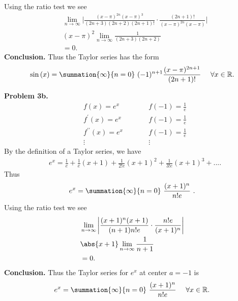 \documentclass{report}
\begin{document}
    Using the ratio test we see
    \begin{align*}
        &\lim\limits_{n \to \infty}{\bigg\lvert \frac{(x-\pi)^{2n}(x-\pi)^{3}}{(2n+3)(2n+2)(2n+1)!} \cdot \frac{(2n+1)!}{(x-\pi)^{2n}(x-\pi)} \bigg\rvert} \\
        &(x-\pi)^{2}\lim\limits_{n \to \infty}{\frac{1}{(2n+3)(2n+2)}} \\
        &=0
    .\end{align*}
    \textbf{Conclusion.} Thus the Taylor series has the form
    \begin{align*}
        \sin{(x)} = \summation{\infty}{n=0}\ (-1)^{n+1}\frac{(x-\pi)^{2n+1}}{(2n+1)!}\  \quad \forall x\in \mathbb{R}
    .\end{align*}

    \bigbreak \noindent 
    \textbf{Problem 3b.} 
    \begin{equation}
    \begin{alignedat}{2}
        &f(x) = e^{x} \quad \quad &&f(-1) = \frac{1}{e} \\
        &f^{\prime}(x) = e^{x} \quad \quad &&f(-1) = \frac{1}{e} \\
        &f^{\prime\prime}(x) = e^{x} \quad \quad &&f(-1) = \frac{1}{e}  \\
        &\vdots \quad \quad &&\vdots
    \end{alignedat}
    \end{equation}
    By the definition of a Taylor series, we have
    \begin{align*}
        &e^{x} = \frac{1}{e} + \frac{1}{e}(x+1) + \frac{1}{2!e}(x+1)^{2}+\frac{1}{3!e}(x+1)^{3} +...
    .\end{align*}
    \bigbreak \noindent 
    Thus 
    \begin{align*}
        e^{x} = \summation{\infty}{n=0}\ \frac{(x+1)^{n}}{n!e}\ 
    .\end{align*}
    Using the ratio test we see
    \begin{align*}
        &\lim\limits_{n \to \infty}{\bigg\lvert \frac{(x+1)^{n}(x+1)}{(n+1)n!e} \cdot \frac{n!e}{(x+1)^{n}} \bigg\rvert} \\
        &\abs{x+1}\lim\limits_{n \to \infty}{\frac{1}{n+1}} \\
        &=0
    .\end{align*}
    \bigbreak \noindent 
    \textbf{Conclusion.} Thus the Taylor series for $e^{x}$ at center $a=-1$ is 
    \begin{align*}
        e^{x} = \summation{\infty}{n=0}\ \frac{(x+1)^{n}}{n!e}\ \quad \forall x\in \mathbb{R}
    .\end{align*}
\end{document}
